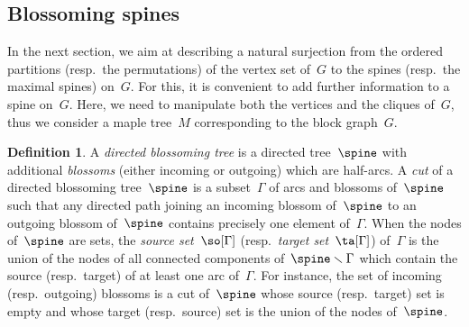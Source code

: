 \documentclass{amsart}
\theoremstyle{definition}
\newtheorem{definition}[theorem]{Definition}
\newcommand{\ssm}{\smallsetminus} %
\newcommand{\darkblue}{\color{darkblue}} %
\newcommand{\defn}[1]{\textsl{\darkblue #1}} %
\begin{document}

\subsection{Blossoming spines}

In the next section, we aim at describing a natural surjection from the ordered partitions (resp.~the permutations) of the vertex set of~$G$ to the spines (resp.~the maximal spines) on~$G$.
For this, it is convenient to add further information to a spine on~$G$.
Here, we need to manipulate both the vertices and the cliques of~$G$, thus we consider a maple tree~$M$ corresponding to the block graph~$G$.

\begin{definition}
  \label{def:blossomingTree}
  A \defn{directed blossoming tree} is a directed tree~$\spine$ with additional \defn{blossoms} (either incoming or outgoing) which are half-arcs.
  A \defn{cut} of a directed blossoming tree~$\spine$ is a subset~$\Gamma$ of arcs and blossoms of~$\spine$ such that any directed path joining an incoming blossom of~$\spine$ to an outgoing blossom of~$\spine$ contains precisely one element of~$\Gamma$.
  When the nodes of~$\spine$ are sets, the \defn{source set}~$\so[\Gamma]$ (resp.~\defn{target set}~$\ta[\Gamma]$) of~$\Gamma$ is the union of the nodes of all connected components of~$\spine \ssm \Gamma$ which contain the source (resp.~target) of at least one arc of~$\Gamma$.
  For instance, the set of incoming (resp.~outgoing) blossoms is a cut of~$\spine$ whose source (resp.~target) set is empty and whose target (resp.~source) set is the union of the nodes of~$\spine$.
\end{definition}

\end{document}
